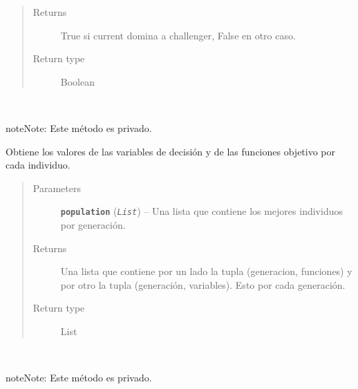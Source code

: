 \documentclass[letterpaper,10pt,english]{sphinxmanual}
\begin{document}
\begin{fulllineitems}
\begin{fulllineitems}
\begin{quote}
\begin{description}
\begin{itemize}
\end{itemize}

\item[{Returns}] \leavevmode
True si current domina a challenger, False en otro caso.

\item[{Return type}] \leavevmode
Boolean

\end{description}\end{quote}

\end{fulllineitems}


\begin{fulllineitems}
\label{Model/Community/Community:Model.Community.Community.Community._Community__get_best_individual_results}~
\begin{notice}{note}{Note:}
Este método es privado.
\end{notice}

Obtiene los valores de las variables de decisión y de las funciones objetivo
por cada individuo.
\begin{quote}\begin{description}
\item[{Parameters}] \leavevmode
\textbf{\texttt{population}} (\emph{\texttt{List}}) -- Una lista que contiene los mejores individuos por generación.

\item[{Returns}] \leavevmode
Una lista que contiene por un lado la tupla (generacion, funciones)
y por otro la tupla (generación, variables). Esto por cada generación.

\item[{Return type}] \leavevmode
List

\end{description}\end{quote}

\end{fulllineitems}


\begin{fulllineitems}
\label{Model/Community/Community:Model.Community.Community.Community._Community__get_pareto_results}~
\begin{notice}{note}{Note:}
Este método es privado.
\end{notice}


\end{fulllineitems}
\end{fulllineitems}
\end{document}
